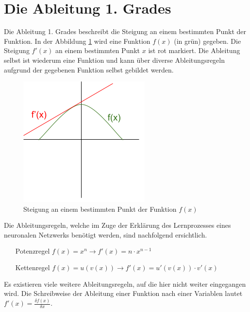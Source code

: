 \section{Die Ableitung 1. Grades}
Die Ableitung 1. Grades beschreibt die Steigung an einem bestimmten Punkt der Funktion. In der Abbildung \ref{fig:00_steigung_an_punkt}
wird eine Funktion $f(x)$ (in grün) gegeben. Die Steigung $f'(x)$ an einem bestimmten Punkt $x$ ist rot markiert.
Die Ableitung selbst ist wiederum eine Funktion und kann über diverse Ableitungsregeln aufgrund der gegebenen Funktion
selbst gebildet werden.
\begin{figure}[h!]
    \begin{center}
        \includegraphics[width=0.4\linewidth]{../common/02_appendix/00_resources/00_derivation.png}
    \end{center}
    \caption{Steigung an einem bestimmten Punkt der Funktion $f(x)$}
    \label{fig:00_steigung_an_punkt}
\end{figure}

Die Ableitungsregeln, welche im Zuge der Erklärung des Lernprozesses eines neuronalen Netzwerks benötigt werden,
sind nachfolgend ersichtlich.
\begin{itemize}
    \item[Potenzregel] $f(x) = x^n \longrightarrow f'(x) = n \cdot x^{n-1}$\label{abl:potenzregel}
    \item[Kettenregel] $f(x) = u(v(x)) \longrightarrow f'(x) = u'(v(x)) \cdot v'(x)$\label{abl:kettenregel}
\end{itemize}
Es existieren viele weitere Ableitungsregeln, auf die hier nicht weiter eingegangen wird.
Die Schreibweise der Ableitung einer Funktion nach einer Variablen lautet $f'(x) = \frac{\delta f(x)}{\delta x}$.

